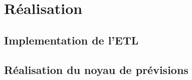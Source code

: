 \chapter{Réalisation}

\cleardoublepage

	\section{Implementation de l'ETL}
	\section{Réalisation du noyau de prévisions}